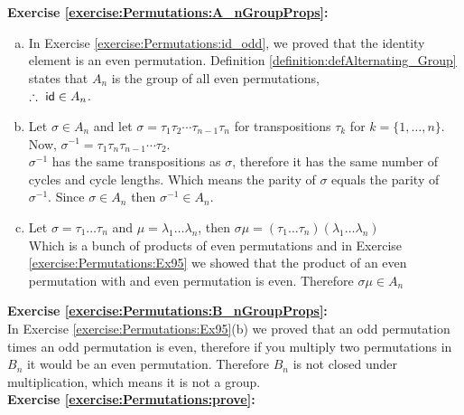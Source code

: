 \noindent\textbf{Exercise  \ref{exercise:Permutations:A_nGroupProps}:} %
\begin{enumerate}[(a)]
\item
In Exercise \ref{exercise:Permutations:id_odd}, we proved that the identity element is an even permutation. Definition \ref{definition:defAlternating_Group} states that $A_{n}$ is the group of all even permutations,\\
$\therefore\ {\sf{i}d}\in A_{n}$.

\item
Let $\sigma\in A_{n}$ and let $\sigma=\tau_{1}\tau_{2}\cdots\tau_{n-1}\tau_{n}$ for transpositions $\tau_{k}$ for $k=\{1,\dots,n\}$. Now, $\sigma^{-1}=\tau_{1}\tau_{n}\tau_{n-1}\cdots\tau_{2}$.\\
        
$\sigma^{-1}$ has the same transpositions as $\sigma$, therefore it has the same number of cycles and cycle lengths. Which means the parity of $\sigma$ equals the parity of $\sigma^{-1}$. Since $\sigma\in A_{n}$ then $\sigma^{-1}\in A_{n}$.
        
\item
Let $\sigma=\tau_{1}\dots\tau_{n}$ and $\mu=\lambda_{1}\dots\lambda_{n}$, then $\sigma\mu=(\tau_{1}\dots\tau_{n})(\lambda_{1}\dots\lambda_{n})$\\

Which is a bunch of products of even permutations and in Exercise \ref{exercise:Permutations:Ex95} we showed that the product of an even permutation with and even permutation is even. Therefore $\sigma\mu\in A_{n}$
\end{enumerate}

\noindent\textbf{Exercise  \ref{exercise:Permutations:B_nGroupProps}:}\\ %
In Exercise  \ref{exercise:Permutations:Ex95}(b) we proved that an odd permutation times an odd permutation is even, therefore if you multiply two permutations in $B_{n}$ it would be an even permutation. Therefore $B_{n}$ is not closed under multiplication, which means it is not a group.\\

\noindent\textbf{Exercise  \ref{exercise:Permutations:prove}:}\\

